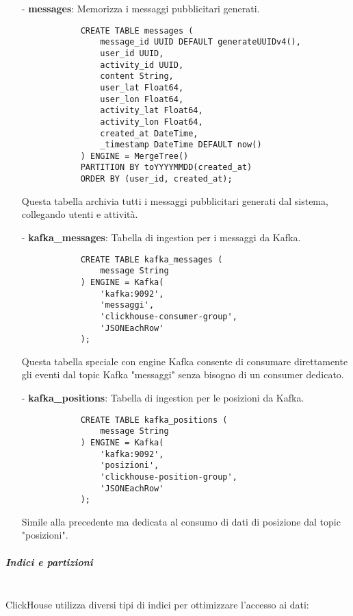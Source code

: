 \documentclass[10pt]{article}
\newcommand{\mysubparagraph}[1]{\subparagraph{#1}\mbox{}\\}
\begin{document}
\begin{itemize}
            \item[-] \textbf{messages}: Memorizza i messaggi pubblicitari generati.
            \begin{lstlisting}
            CREATE TABLE messages (
                message_id UUID DEFAULT generateUUIDv4(),
                user_id UUID,
                activity_id UUID,
                content String,
                user_lat Float64,
                user_lon Float64,
                activity_lat Float64,
                activity_lon Float64,
                created_at DateTime,
                _timestamp DateTime DEFAULT now()
            ) ENGINE = MergeTree()
            PARTITION BY toYYYYMMDD(created_at)
            ORDER BY (user_id, created_at);
            \end{lstlisting}
            Questa tabella archivia tutti i messaggi pubblicitari generati dal sistema, collegando utenti e attività.
            
            \item[-] \textbf{kafka\_messages}: Tabella di ingestion per i messaggi da Kafka.
            \begin{lstlisting}
            CREATE TABLE kafka_messages (
                message String
            ) ENGINE = Kafka(
                'kafka:9092', 
                'messaggi', 
                'clickhouse-consumer-group',
                'JSONEachRow'
            );
            \end{lstlisting}
            Questa tabella speciale con engine Kafka consente di consumare direttamente gli eventi dal topic Kafka "messaggi" senza bisogno di un consumer dedicato.
            
            \item[-] \textbf{kafka\_positions}: Tabella di ingestion per le posizioni da Kafka.
            \begin{lstlisting}
            CREATE TABLE kafka_positions (
                message String
            ) ENGINE = Kafka(
                'kafka:9092', 
                'posizioni', 
                'clickhouse-position-group',
                'JSONEachRow'
            );
            \end{lstlisting}
            Simile alla precedente ma dedicata al consumo di dati di posizione dal topic "posizioni".
        \end{itemize}
        
        \mysubparagraph{Indici e partizioni}
        ClickHouse utilizza diversi tipi di indici per ottimizzare l'accesso ai dati:
        
\end{document}
